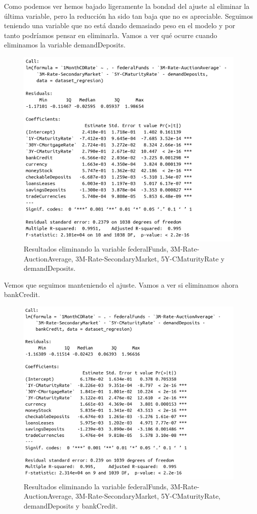 \documentclass[12pt,a4paper]{article}
\begin{document}
Como podemos ver hemos bajado ligeramente la bondad del ajuste al eliminar la última variable, pero la reducción ha sido tan baja que no es apreciable. Seguimos teniendo una variable que no está dando demasiado peso en el modelo y por tanto podríamos pensar en eliminarla. Vamos a ver qué ocurre cuando eliminamos la variable demandDeposits.

\begin{figure}[H]
	\centering 
	\includegraphics[scale=0.6]{./Imagenes/Regresion/regresion_multiple6.png}
	\caption{Resultados eliminando la variable federalFunds, 3M-Rate-AuctionAverage, 3M-Rate-SecondaryMarket, 5Y-CMaturityRate y demandDeposits.}
\end{figure}

Vemos que seguimos manteniendo el ajuste. Vamos a ver si eliminamos ahora bankCredit.

\begin{figure}[H]
	\centering 
	\includegraphics[scale=0.6]{./Imagenes/Regresion/regresion_multiple7.png}
	\caption{Resultados eliminando la variable federalFunds, 3M-Rate-AuctionAverage, 3M-Rate-SecondaryMarket, 5Y-CMaturityRate, demandDeposits y bankCredit.}
\end{figure}
\end{document}
